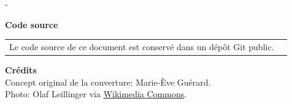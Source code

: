 \begin{adjustwidth*}{\unitlength}{-\unitlength}

  \textbf{Code source} \\[4pt]
  \begin{tabularx}{1.0\linewidth}{@{}Xl@{}}
    Le code source de ce document est conservé dans un dépôt
    Git public. &
                         \raisebox{-7pt}{%
                         \href{https://github.com/vigou3/formation-latex-ul/}{%
                         \browsebutton}}
  \end{tabularx}
  \vspace*{4mm}

  \textbf{Crédits} \\
  Concept original de la couverture: Marie-Ève Guérard. \\
  Photo: Olaf Leillinger via
  \href{https://commons.wikimedia.org/wiki/File:Suricata.suricatta.6861.jpg}{%
    Wikimedia Commons}.
\end{adjustwidth*}
\endgroup

